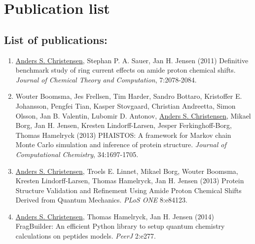 \chapter*{Publication list}

\section*{List of publications:}
\begin{enumerate}
    \item \underline{Anders S. Christensen}, Stephan P. A. Sauer, Jan H. Jensen (2011) Definitive benchmark study of ring current effects on amide proton chemical shifts. \textit{Journal of Chemical Theory and Computation}, 7:2078-2084.
    \item Wouter Boomsma, Jes Frellsen, Tim Harder, Sandro Bottaro, Kristoffer E. Johansson, Pengfei Tian, Kasper Stovgaard, Christian Andreetta, Simon Olsson, Jan B. Valentin, Lubomir D. Antonov, \underline{Anders S. Christensen}, Mikael Borg, Jan H. Jensen, Kresten Lindorff-Larsen, Jesper Ferkinghoff-Borg, Thomas Hamelryck (2013) PHAISTOS: A framework for Markov chain Monte Carlo simulation and inference of protein structure. \textit{Journal of Computational Chemistry}, 34:1697-1705.
    \item  \underline{Anders S. Christensen}, Troels E. Linnet, Mikael Borg, Wouter Boomsma, Kresten Lindorff-Larsen, Thomas Hamelryck, Jan H. Jensen (2013)  Protein Structure Validation and Refinement Using Amide Proton Chemical Shifts Derived from Quantum Mechanics. \textit{PLoS ONE} 8:e84123.
    \item \underline{Anders S. Christensen}, Thomas Hamelryck, Jan H. Jensen (2014) FragBuilder: An efficient Python library to setup quantum chemistry calculations on peptides models. \textit{PeerJ} 2:e277.
\end{enumerate}
